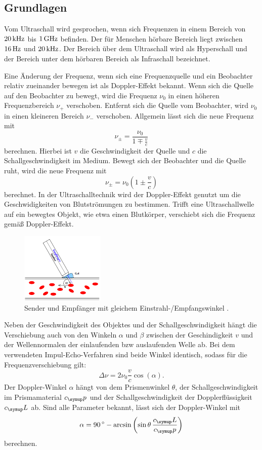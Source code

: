 \subsection{Grundlagen}
Vom Ultraschall wird gesprochen, wenn sich Frequenzen in einem Bereich von
$20\,\si{\kilo\hertz}$ bis $1\,\si{\giga\hertz}$ befinden. Der für Menschen hörbare Bereich liegt zwischen
$16\,\si{\hertz}$ und $20\,\si{\kilo\hertz}$. Der Bereich über dem Ultraschall wird als Hyperschall und
der Bereich unter dem hörbaren Bereich als Infraschall bezeichnet.

Eine Änderung der Frequenz, wenn sich eine Frequenzquelle und ein Beobachter
relativ zueinander bewegen ist als Doppler-Effekt bekannt. Wenn sich die Quelle
auf den Beobachter zu bewegt, wird die Frequenz $\nu_0$ in einen höheren
Frequenzbereich $\nu_+$ verschoben. Entfernt sich die Quelle vom Beobachter,
wird $\nu_0$ in einen kleineren Bereich $\nu_-$ verschoben. Allgemein lässt
sich die neue Frequenz mit
\begin{equation}
  \nu_\pm = \frac{\nu_0}{1\mp\frac{v}{c}}
\end{equation}
berechnen. Hierbei ist $v$ die Geschwindigkeit der Quelle und $c$ die
Schallgeschwindigkeit im Medium.
Bewegt sich der Beobachter und die Quelle ruht, wird die neue Frequenz mit
\begin{equation}
  \nu_\pm=\nu_0\left(1\pm\frac{v}{c}\right)
\end{equation}
berechnet. In der Ultraschalltechnik wird der Doppler-Effekt genutzt um die
Geschwidigkeiten von Blutströmungen zu bestimmen. Trifft eine Ultraschallwelle
auf ein bewegtes Objekt, wie etwa einen Blutkörper, verschiebt sich die Frequenz
gemäß Doppler-Effekt.
\begin{figure}
  \centering
  \includegraphics[width=4cm]{bilder/sender.png}
  \caption{Sender und Empfänger mit gleichem Einstrahl-/Empfangswinkel \cite{us3}.}
\end{figure}
Neben der Geschwindigkeit des Objektes und der
Schallgeschwindigkeit hängt die Verschiebung auch von den Winkeln $\alpha$ und
$\beta$ zwischen der Geschindigkeit $v$ und der Wellennormalen der einlaufenden
bzw auslaufenden Welle ab. Bei dem verwendeten Impul-Echo-Verfahren sind beide
Winkel identisch, sodass für die Frequenzverschiebung gilt:
\begin{equation}
  \Delta\nu = 2\nu_0\frac{v}{c}\cos(\alpha).
  \label{eqn:deltanu}
\end{equation}
Der Doppler-Winkel $\alpha$ hängt von dem Prismenwinkel $\theta$, der
Schallgeschwindigkeit im Prismamaterial $c_\su{p}$ und der Schallgeschwindigkeit
der Dopplerflüssigkeit $c_\su{L}$ ab. Sind alle Parameter bekannt, lässt sich
der Doppler-Winkel mit
\begin{equation}
  \alpha = 90\dgr -\arcsin\left(\sin\theta\,\frac{c_\su{L}}{c_\su{p}}\right)
  \label{eqn:alpha}
\end{equation}
berechnen.
